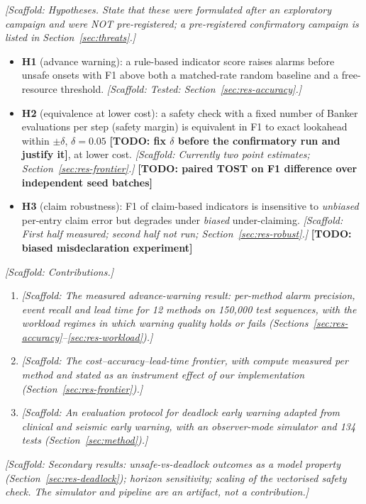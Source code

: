 \documentclass[conference]{IEEEtran}
\newcommand{\scaffold}[1]{\textcolor{blue!60!black}{\textit{[Scaffold: #1]}}}
\newcommand{\todo}[1]{\textcolor{red!70!black}{\textbf{[TODO: #1]}}}
\begin{document}
\scaffold{Hypotheses. State that these were formulated after an exploratory campaign and were NOT pre-registered; a pre-registered confirmatory campaign is listed in Section~\ref{sec:threats}.}
\begin{itemize}
\item \textbf{H1} (advance warning): a rule-based indicator score raises alarms before unsafe onsets with F1 above both a matched-rate random baseline and a free-resource threshold. \scaffold{Tested: Section~\ref{sec:res-accuracy}.}
\item \textbf{H2} (equivalence at lower cost): a safety check with a fixed number of Banker evaluations per step (safety margin) is equivalent in F1 to exact lookahead within $\pm\delta$, $\delta=0.05$ \todo{fix $\delta$ before the confirmatory run and justify it}, at lower cost. \scaffold{Currently two point estimates; Section~\ref{sec:res-frontier}.} \todo{paired TOST on F1 difference over independent seed batches}
\item \textbf{H3} (claim robustness): F1 of claim-based indicators is insensitive to \emph{unbiased} per-entry claim error but degrades under \emph{biased} under-claiming. \scaffold{First half measured; second half not run; Section~\ref{sec:res-robust}.} \todo{biased misdeclaration experiment}
\end{itemize}

\scaffold{Contributions.}
\begin{enumerate}
\item[C1] \scaffold{The measured advance-warning result: per-method alarm precision, event recall and lead time for 12 methods on 150,000 test sequences, with the workload regimes in which warning quality holds or fails (Sections~\ref{sec:res-accuracy}--\ref{sec:res-workload}).}
\item[C2] \scaffold{The cost--accuracy--lead-time frontier, with compute measured per method and stated as an instrument effect of our implementation (Section~\ref{sec:res-frontier}).}
\item[C3] \scaffold{An evaluation protocol for deadlock early warning adapted from clinical and seismic early warning, with an observer-mode simulator and 134 tests (Section~\ref{sec:method}).}
\end{enumerate}
\scaffold{Secondary results: unsafe-vs-deadlock outcomes as a model property (Section~\ref{sec:res-deadlock}); horizon sensitivity; scaling of the vectorised safety check. The simulator and pipeline are an artifact, not a contribution.}
\end{document}
